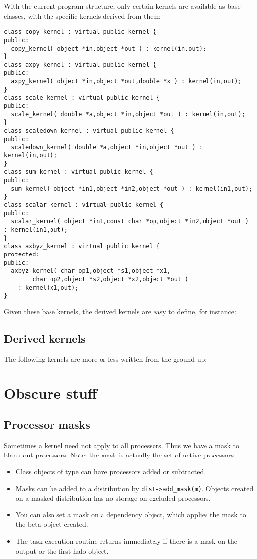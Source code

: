 \documentclass[11pt,fleqn,preprint]{impreport}
\begin{document}
With the current program structure, only certain kernels are available
as base classes, with the specific kernels derived from them:
\begin{verbatim}
class copy_kernel : virtual public kernel {
public:
  copy_kernel( object *in,object *out ) : kernel(in,out);
}
class axpy_kernel : virtual public kernel {
public:
  axpy_kernel( object *in,object *out,double *x ) : kernel(in,out);
}
class scale_kernel : virtual public kernel {
public:
  scale_kernel( double *a,object *in,object *out ) : kernel(in,out);
}
class scaledown_kernel : virtual public kernel {
public:
  scaledown_kernel( double *a,object *in,object *out ) : kernel(in,out);
}
class sum_kernel : virtual public kernel {
public:
  sum_kernel( object *in1,object *in2,object *out ) : kernel(in1,out);
}
class scalar_kernel : virtual public kernel {
public:
  scalar_kernel( object *in1,const char *op,object *in2,object *out ) : kernel(in1,out);
}
class axbyz_kernel : virtual public kernel {
protected:
public:
  axbyz_kernel( char op1,object *s1,object *x1,
		char op2,object *s2,object *x2,object *out )
    : kernel(x1,out);
}
\end{verbatim}

Given these base kernels, the derived kernels are easy to define, for
instance:

\subsection{Derived kernels}

The following kernels are more or less written from the ground up:
%
%
%
%
%

\section{Obscure stuff}

\subsection{Processor masks}

Sometimes a kernel need not apply to all processors. Thus we have a
mask to blank out processors. Note: the mask is actually the set of
active processors.

\begin{itemize}
\item Class objects of type  can have processors
  added or subtracted.
\item Masks can be added to a distribution by
  \verb+dist->add_mask(m)+. Objects created on a masked distribution
  has no storage on excluded processors.
\item You can also set a mask on a dependency object, which applies
  the mask to the beta object created.
\item The task execution routine returns immediately if there is a
  mask on the output or the first halo object.
\end{itemize}
\end{document}
